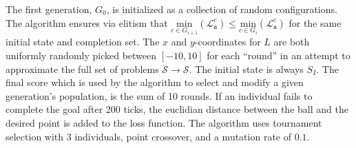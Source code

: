 The first generation, \(G_0\), is initialized as a collection of random configurations. The algorithm ensures via elitism that \(\underset{c\in G_{i+1}}{\text{min}}\left( \mathscr{L}^{c}_\mathfrak{a} \right) \le \underset{c\in G_{i}}{\text{min}}\left( \mathscr{L}^{c}_\mathfrak{a} \right)\) for the same initial state and completion set. The \(x\) and \(y\)-coordinates for \(L\) are both uniformly randomly picked between \([-10,10]\) for each ``round'' in an attempt to approximate the full set of problems \(\mathcal{S}\to\mathcal{S}\). The initial state is always \(S_I\). The final score which is used by the algorithm to select and modify a given generation's population, is the sum of 10 rounds. If an individual fails to complete the goal after 200 ticks, the euclidian distance between the ball and the desired point is added to the loss function. The algorithm uses tournament selection with 3 individuals, point crossover, and a mutation rate of \(0.1\).
